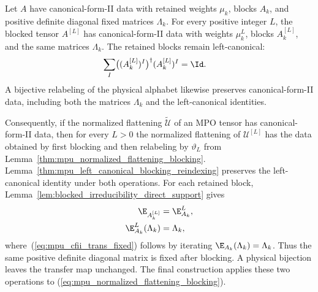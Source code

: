 \begin{definition}
    \label{def:mpu_cfii_blocking_reindexing}
    \leanok
    Let $A$ have canonical-form-II data with retained weights $\mu_k$, blocks
    $A_k$, and positive definite diagonal fixed matrices $\Lambda_k$. For
    every positive integer $L$, the blocked tensor $A^{[L]}$ has
    canonical-form-II data with weights $\mu_k^L$, blocks $A_k^{[L]}$, and
    the same matrices $\Lambda_k$. The retained blocks remain
    left-canonical:
    \begin{align}
        \sum_I \bigl((A_k^{[L]})^I\bigr)^\dagger(A_k^{[L]})^I & =\Id.
    \end{align}
    A bijective relabeling of the physical alphabet likewise preserves
    canonical-form-II data, including both the matrices $\Lambda_k$ and the
    left-canonical identities.

    Consequently, if the normalized flattening $\widetilde{\mathcal U}$ of an
    MPO tensor has canonical-form-II data, then for every $L>0$ the normalized
    flattening of $\mathcal U^{[L]}$ has the data obtained by first blocking
    and then relabeling by $\vartheta_L$ from
    Lemma~\ref{thm:mpu_normalized_flattening_blocking}.
    Lemma~\ref{thm:mpu_left_canonical_blocking_reindexing} preserves the
    left-canonical identity under both operations. For each retained block,
    Lemma~\ref{lem:blocked_irreducibility_direct_support} gives
    \begin{align}
        \E_{A_k^{[L]}}          & =\E_{A_k}^{L},
        \notag                                   \\
        \E_{A_k}^{L}(\Lambda_k) & =\Lambda_k,
        \label{eq:mpu_cfii_trans_fixed}
    \end{align}
    where~(\ref{eq:mpu_cfii_trans_fixed}) follows by iterating
    $\E_{A_k}(\Lambda_k)=\Lambda_k$. Thus the same positive definite diagonal
    matrix is fixed after blocking. A physical bijection leaves the transfer
    map unchanged. The
    final construction applies these two operations to
    (\ref{eq:mpu_normalized_flattening_blocking}).
\end{definition}

